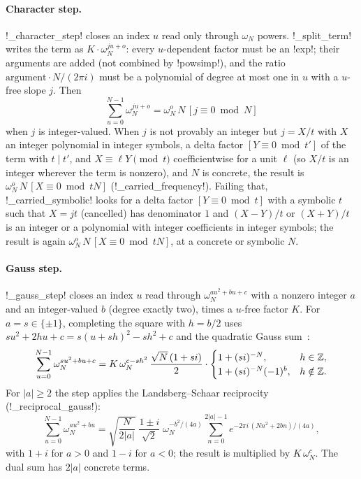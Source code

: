 \paragraph{Character step.} \py!_character_step! closes an index $u$ read only through $\omega_N$ powers. \py!_split_term! writes the term as $K\cdot\omega_N^{ju+o}$: every $u$-dependent factor must be an \py!exp!; their arguments are added (not combined by \py!powsimp!), and the ratio $\mathrm{argument}\cdot N/(2\pi i)$ must be a polynomial of degree at most one in $u$ with a $u$-free slope $j$. Then
\begin{equation}\label{eq:algebra-character}
\sum_{u=0}^{N-1}\omega_N^{ju+o}=\omega_N^{o}\,N\,[j\equiv 0\bmod N]
\end{equation}
when $j$ is integer-valued. When $j$ is not provably an integer but $j=X/t$ with $X$ an integer polynomial in integer symbols, a delta factor $[Y\equiv 0\bmod t']$ of the term with $t\mid t'$, and $X\equiv \ell Y \pmod t$ coefficientwise for a unit $\ell$ (so $X/t$ is an integer wherever the term is nonzero), and $N$ is concrete, the result is $\omega_N^{o}\,N\,[X\equiv 0\bmod tN]$ (\py!_carried_frequency!). Failing that, \py!_carried_symbolic! looks for a delta factor $[Y\equiv0\bmod t]$ with a symbolic $t$ such that $X=jt$ (cancelled) has denominator $1$ and $(X-Y)/t$ or $(X+Y)/t$ is an integer or a polynomial with integer coefficients in integer symbols; the result is again $\omega_N^{o}\,N\,[X\equiv 0\bmod tN]$, at a concrete or symbolic $N$.

\paragraph{Gauss step.} \py!_gauss_step! closes an index $u$ read through $\omega_N^{au^2+bu+c}$ with a nonzero integer $a$ and an integer-valued $b$ (degree exactly two), times a $u$-free factor $K$. For $a=s\in\{\pm1\}$, completing the square with $h=b/2$ uses $s u^2+2hu+c=s(u+sh)^2-sh^2+c$ and the quadratic Gauss sum~\cite{berndt1998gauss}:
\begin{equation}
\sum_{u=0}^{N-1}\omega_N^{su^2+bu+c}=K\,\omega_N^{c-sh^2}\,\frac{\sqrt N\,(1+si)}{2}\cdot\begin{cases}1+(si)^{-N}, & h\in\mathbb{Z},\\ 1+(si)^{-N}(-1)^{b}, & h\notin\mathbb{Z}.\end{cases}
\end{equation}
For $|a|\ge 2$ the step applies the Landsberg--Schaar reciprocity~\cite{landsberg1893gauss,berndt1998gauss} (\py!_reciprocal_gauss!):
\begin{equation}
\sum_{u=0}^{N-1}\omega_N^{au^2+bu}=\sqrt{\frac{N}{2|a|}}\;\frac{1\pm i}{\sqrt2}\;\omega_N^{-b^2/(4a)}\sum_{n=0}^{2|a|-1}e^{-2\pi i\,(Nn^2+2bn)/(4a)},
\end{equation}
with $1+i$ for $a>0$ and $1-i$ for $a<0$; the result is multiplied by $K\,\omega_N^{c}$. The dual sum has $2|a|$ concrete terms.

